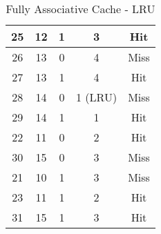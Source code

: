 \documentclass[12pt]{article}
\begin{document}
\begin{table}
\begin{tabular}{|c|c|c|c|c|}
\hline
25                & 12                 & 1                                                                              & 3                                                                        & Hit                 \\ 
\hline
26                & 13                 & 0                                                                              & 4                                                                        & Miss                \\ 
\hline
27                & 13                 & 1                                                                              & 4                                                                        & Hit                 \\ 
\hline
28                & 14                 & 0                                                                              & 1 (LRU)                                                                  & Miss                \\ 
\hline
29                & 14                 & 1                                                                              & 1                                                                        & Hit                 \\ 
\hline
22                & 11                 & 0                                                                              & 2                                                                        & Hit                 \\ 
\hline
30                & 15                 & 0                                                                              & 3                                                                        & Miss                \\ 
\hline
21                & 10                 & 1                                                                              & 3                                                                        & Miss                \\ 
\hline
23                & 11                 & 1                                                                              & 2                                                                        & Hit                 \\ 
\hline
31                & 15                 & 1                                                                              & 3                                                                        & Hit                 \\
\hline
\end{tabular}
\caption{Fully Associative Cache - LRU}
\end{table}
\end{document}
